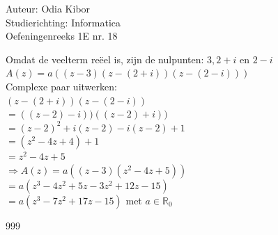 \documentclass[a4paper]{article}
\begin{document}
  
\noindent \large Auteur: Odia Kibor \\
\noindent \large Studierichting: Informatica\\
\noindent \large Oefeningenreeks 1E nr. 18\\

\medskip

\normalsize


Omdat de veelterm reëel is, zijn de nulpunten: $3, 2 + i$ en $2 - i$\\

$A(z) = a((z-3)(z - (2 + i))(z - (2 - i)))$\\

Complexe paar uitwerken:\\

$(z - (2 + i))(z - (2 - i))$\\

$= ((z - 2) - i))((z - 2) + i))$\\

$= (z - 2)^2 + i(z - 2) - i(z - 2 ) + 1$\\

$= (z^2 - 4z + 4) + 1$\\

$= z^2 - 4z + 5$\\

$\Rightarrow A(z) = a((z-3)(z^2 - 4z + 5))$\\

$= a(z^3 - 4z^2 + 5z - 3z^2 + 12z -15)$\\

$= a(z^3 - 7z^2 + 17z - 15)$ met $a \in \mathbb{R}_0$







\begin{thebibliography}{999}
\end{thebibliography}
\end{document}
